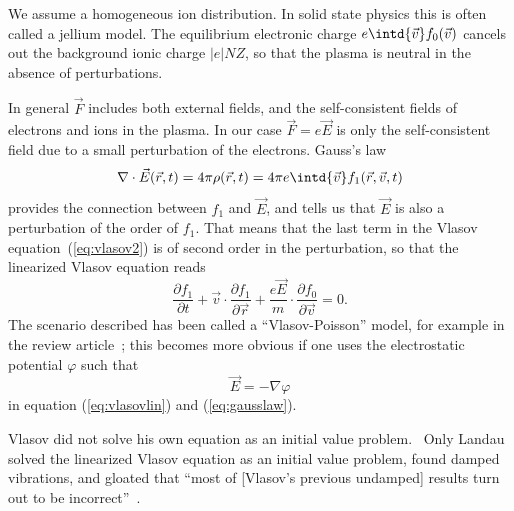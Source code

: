 \documentclass[physics,phd,nolot,nolof]{uccthesis}%
\begin{document}
We assume a homogeneous ion distribution. In solid state physics this is often called a jellium model. 
The equilibrium electronic charge $e\intd{\vec v} f_0(\vec v)$ cancels out the background ionic charge $|e|NZ$, so that the plasma is neutral in the absence of perturbations.

In general $\vec F $ includes both external fields, and the self-consistent fields of electrons and ions in the plasma.
In our case $\vec F=e \vec E$ is only the self-consistent field due to a small perturbation of the electrons. 
Gauss's law 
\begin{equation}
\nabla\cdot \vec E(\vec r,t) = 4\pi\rho(\vec r,t)
=4\pi e\intd{\vec v}f_1(\vec r, \vec v,t)
	\label{eq:gausslaw}
\end{equation}
provides the connection between $f_1$ and $\vec E$, and tells us that $\vec E$ is also a perturbation of the order of $f_1$. 
That means that the last term in the Vlasov equation~(\ref{eq:vlasov2}) is of second order in the perturbation, so that the linearized Vlasov equation reads
	\begin{equation}
	\frac{\partial f_1}{\partial t}+
	\vec{v}\cdot\frac{\partial f_1}{\partial \vec{r}} +
	\frac{e \vec E}{m} \cdot \frac{\partial f_0}{\partial \vec v} 
	=0.
	\label{eq:vlasovlin}
\end{equation}
The scenario described has been called a ``Vlasov-Poisson'' model, for example in the review article~\cite{howtomodelqmplasmas}; this becomes more obvious if one uses the electrostatic potential $\varphi$ such that 
\begin{equation}
	\vec E=-\nabla \varphi
	\label{eq:defpotenatial}
\end{equation}
in equation (\ref{eq:vlasovlin}) and (\ref{eq:gausslaw}).

Vlasov did not solve his own equation as an initial value problem.~\cite{vlasov} 
Only Landau solved the linearized Vlasov equation as an initial value problem, found damped vibrations, and gloated that ``most of [Vlasov's previous undamped] results turn out to be incorrect''~\cite{Landaudamping1946}.
\end{document}
